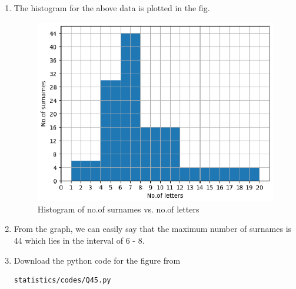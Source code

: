 \renewcommand{\theequation}{\theenumi}
\begin{enumerate}[label=\thesection.\arabic*.,ref=\thesection.\theenumi]
\item The histogram for the above data is plotted in the fig. 
\begin{figure}[!ht]
\centering
\includegraphics[width= \columnwidth]{./statistics/figs/Q45.eps}
\caption{Histogram of no.of surnames vs. no.of letters}
\end{figure}

\item From the graph, we can easily say that the maximum number of surnames is 44 which lies in the interval of 6 - 8.
\item Download the python code for the figure from 
\begin{lstlisting}
statistics/codes/Q45.py
\end{lstlisting}

\end{enumerate}